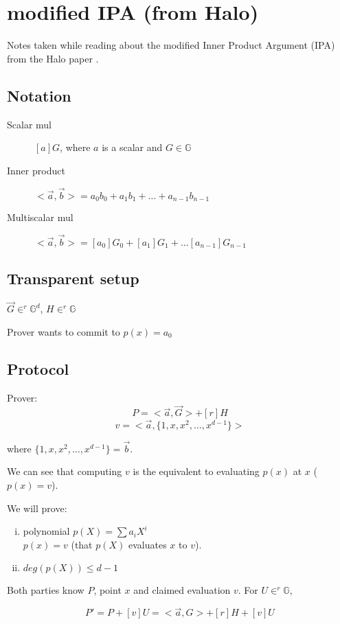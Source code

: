 \documentclass{article}
\theoremstyle{definition}
\begin{document}
\section{modified IPA (from Halo)}
Notes taken while reading about the modified Inner Product Argument (IPA) from the Halo paper \cite{cryptoeprint:2019/1021}.

\subsection{Notation}
\begin{description}
    \item[Scalar mul] $[a]G$, where $a$ is a scalar and $G \in \mathbb{G}$
    \item[Inner product] $<\overrightarrow{a}, \overrightarrow{b}> = a_0 b_0 + a_1 b_1 + \ldots + a_{n-1} b_{n-1}$
    \item[Multiscalar mul] $<\overrightarrow{a}, \overrightarrow{b}> = [a_0] G_0 + [a_1] G_1 + \ldots [a_{n-1}] G_{n-1}$
\end{description}


\subsection{Transparent setup}
$\overrightarrow{G} \in^r \mathbb{G}^d$, $H \in^r \mathbb{G}$

Prover wants to commit to $p(x)=a_0$
\subsection{Protocol}
Prover:
$$P=<\overrightarrow{a}, \overrightarrow{G}> + [r]H$$
$$v=<\overrightarrow{a}, \{1, x, x^2, \ldots, x^{d-1} \} >$$

where $\{1, x, x^2, \ldots, x^{d-1} \} = \overrightarrow{b}$.

We can see that computing $v$ is the equivalent to evaluating $p(x)$ at $x$ ($p(x)=v$).

We will prove:
\begin{enumerate}[i.]
    \item polynomial $p(X) = \sum a_i X^i$\\
	$p(x) = v$ (that $p(X)$ evaluates $x$ to $v$).
    \item $deg(p(X)) \leq d-1$
\end{enumerate}


Both parties know $P$, point $x$ and claimed evaluation $v$. For $U \in^r \mathbb{G}$,

$$P' = P + [v] U = <\overrightarrow{a}, G> + [r]H + [v] U$$
\end{document}
